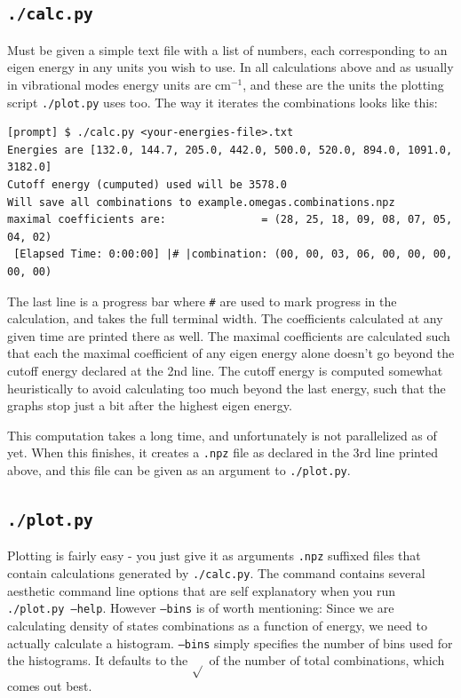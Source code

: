 \subsection{\texttt{./calc.py}}

Must be given a simple text file with a list of numbers, each corresponding to an eigen energy in any units you wish to use. In all calculations above and as usually in vibrational modes energy units are $\mathrm{cm}^{-1}$, and these are the units the plotting script \texttt{./plot.py} uses too. The way it iterates the combinations looks like this:

\begin{verbatim}
[prompt] $ ./calc.py <your-energies-file>.txt
Energies are [132.0, 144.7, 205.0, 442.0, 500.0, 520.0, 894.0, 1091.0, 3182.0]
Cutoff energy (cumputed) used will be 3578.0
Will save all combinations to example.omegas.combinations.npz
maximal coefficients are:               = (28, 25, 18, 09, 08, 07, 05, 04, 02)
 [Elapsed Time: 0:00:00] |# |combination: (00, 00, 03, 06, 00, 00, 00, 00, 00)
\end{verbatim}

The last line is a progress bar where \texttt{\#} are used to mark progress in the calculation, and takes the full terminal width. The coefficients calculated at any given time are printed there as well. The maximal coefficients are calculated such that each the maximal coefficient of any eigen energy alone doesn't go beyond the cutoff energy declared at the 2nd line. The cutoff energy is computed somewhat heuristically to avoid calculating too much beyond the last energy, such that the graphs stop just a bit after the highest eigen energy.

This computation takes a long time, and unfortunately is not parallelized as of yet. When this finishes, it creates a \texttt{.npz} file as declared in the 3rd line printed above, and this file can be given as an argument to \texttt{./plot.py}.

\subsection{\texttt{./plot.py}}

Plotting is fairly easy - you just give it as arguments \texttt{.npz} suffixed files that contain calculations generated by \texttt{./calc.py}. The command contains several aesthetic command line options that are self explanatory when you run \texttt{./plot.py --help}. However \texttt{--bins} is of worth mentioning: Since we are calculating density of states combinations as a function of energy, we need to actually calculate a histogram. \texttt{--bins} simply specifies the number of bins used for the histograms. It defaults to the $\sqrt{}$ of the number of total combinations, which comes out best.

